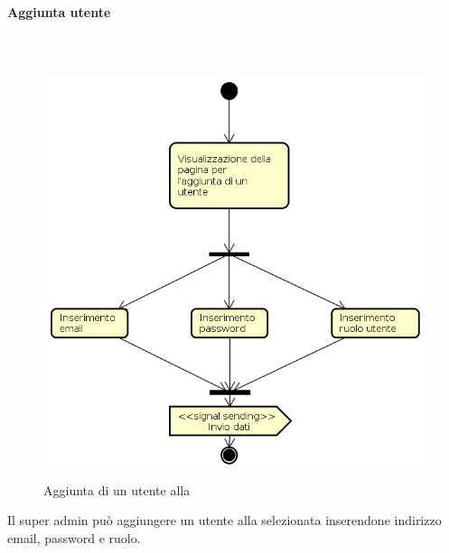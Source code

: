 \paragraph{Aggiunta utente} \mbox{} \\
\begin{figure}[H]
\begin{center}
\includegraphics[height=12cm]{res/sections/backend/activities/aggiuntaUtenteSA.png}
\caption{Aggiunta di un utente alla }
\end{center}
\end{figure}
Il super admin può aggiungere un utente alla  selezionata inserendone indirizzo email, password e ruolo. 
